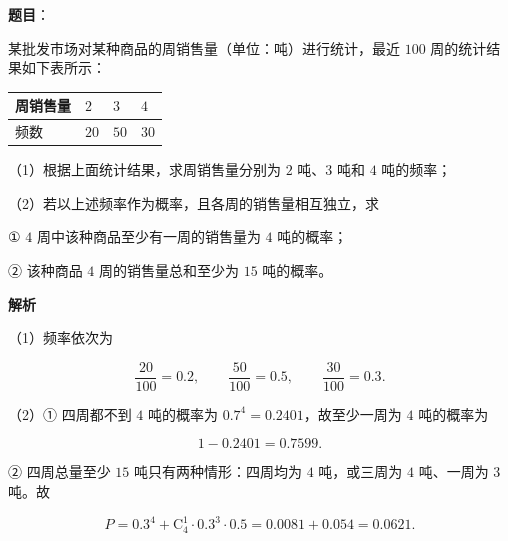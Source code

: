 \begin{answer}

\textbf{题目}：

某批发市场对某种商品的周销售量（单位：吨）进行统计，最近 $100$ 周的统计结果如下表所示：

\begin{center}
\begin{tabular}{llll}
\toprule
周销售量 & $2$ & $3$ & $4$ \\
\midrule
频数 & $20$ & $50$ & $30$ \\
\bottomrule
\end{tabular}
\end{center}

（1）根据上面统计结果，求周销售量分别为 $2$ 吨、$3$ 吨和 $4$ 吨的频率；

（2）若以上述频率作为概率，且各周的销售量相互独立，求

① $4$ 周中该种商品至少有一周的销售量为 $4$ 吨的概率；

② 该种商品 $4$ 周的销售量总和至少为 $15$ 吨的概率。

\textbf{解析}

（1）频率依次为

\nopagebreak[4]
\[\frac{20}{100}=0.2,\qquad\frac{50}{100}=0.5,\qquad\frac{30}{100}=0.3.\]

（2）① 四周都不到 $4$ 吨的概率为 $0.7^4=0.2401$，故至少一周为 $4$ 吨的概率为

\nopagebreak[4]
\[1-0.2401=0.7599.\]

② 四周总量至少 $15$ 吨只有两种情形：四周均为 $4$ 吨，或三周为 $4$ 吨、一周为 $3$ 吨。故

\nopagebreak[4]
\[P=0.3^4+\mathrm C_4^1\cdot0.3^3\cdot0.5=0.0081+0.054=0.0621.\]


\end{answer}
